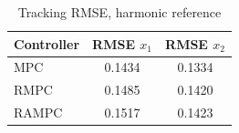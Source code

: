 \begin{table}[t]
\centering
\caption{Tracking RMSE, harmonic reference}
\label{tab:rmse_harmonic_mpc_rmpc_rampc}
\begin{tabular}{lcc}
\toprule
Controller & RMSE $x_1$ & RMSE $x_2$ \\
\midrule
MPC & 0.1434 & 0.1334 \\
RMPC & 0.1485 & 0.1420 \\
RAMPC & 0.1517 & 0.1423 \\
\bottomrule
\end{tabular}
\end{table}
